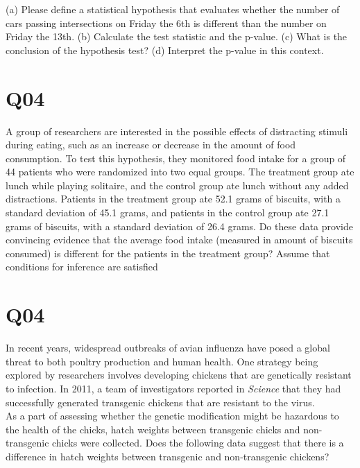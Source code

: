 \documentclass[11pt]{article}
\begin{document}
(a) Please define a statistical hypothesis that evaluates whether the number of cars passing intersections on Friday the 6th is different than the number on Friday the 13th.
(b) Calculate the test statistic and the p-value.
(c) What is the conclusion of the hypothesis test?
(d) Interpret the p-value in this context.

\clearpage

\section*{Q04}

A group of researchers are interested in the possible effects of distracting stimuli during eating, such as an increase or decrease in the amount of food consumption. To test this hypothesis, they monitored food intake for a group of 44 patients who were randomized into two equal groups. The treatment group ate lunch while playing solitaire, and the control group ate lunch without any added distractions. Patients in the treatment group ate 52.1 grams of biscuits, with a standard deviation of 45.1 grams, and patients in the control group ate 27.1 grams of biscuits, with a standard deviation of 26.4 grams. Do these data provide convincing evidence that the average food intake (measured in amount of biscuits consumed) is different for the patients in the treatment group? Assume that conditions for inference are satisfied

\vspace{1in}


\section*{Q04}

In recent years, widespread outbreaks of avian influenza have posed a global threat to both poultry production and human health. One strategy being explored by researchers involves developing chickens that are genetically resistant to infection. In 2011, a team of investigators reported in \textit{Science} that they had successfully generated transgenic chickens that are resistant to the virus.\\

As a part of assessing whether the genetic modification might be hazardous to the health of the chicks, hatch weights between transgenic chicks and non-transgenic chicks were collected. Does the following data suggest that there is a difference in hatch weights between transgenic and non-transgenic chickens?\\
\end{document}
